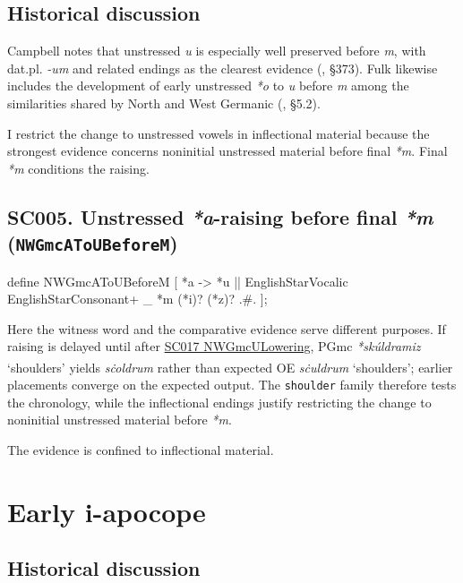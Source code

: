 \documentclass[
  british,
  a4paper,
  openany]{book}
\providecommand{\Pred}[1]{\textsuperscript{\dag}\emph{#1}}
\providecommand{\Recon}[1]{\emph{*#1}}
{\catcode`→=\active \global\def→{\ensuremath{\rightarrow}}}
\providecommand{\texorpdfstring}[2]{#1}
\providecommand{\Pred}[1]{\textsuperscript{\dag}\emph{#1}}
\providecommand{\Recon}[1]{\emph{*#1}}
{\catcode`→=\active \global\def→{\ensuremath{\rightarrow}}}
\begin{document}
\subsection{Historical discussion}\label{historical-discussion-2}

Campbell notes that unstressed \emph{u} is especially well preserved
before \emph{m}, with dat.pl. \emph{-um} and related endings as the
clearest evidence (,
§373). Fulk likewise includes the development of early unstressed
\emph{*o} to \emph{u} before \emph{m} among the similarities shared by
North and West Germanic (, §5.2).

I restrict the change to unstressed vowels in inflectional material
because the strongest evidence concerns noninitial unstressed material
before final \emph{*m}. Final \emph{*m} conditions the raising.

\subsection{\texorpdfstring{SC005. Unstressed \emph{*a}-raising before
final \emph{*m}
(\texttt{NWGmcAToUBeforeM})}{SC005. Unstressed -raising before final  (NWGmcAToUBeforeM)}}\label{rule-NWGmcAToUBeforeM}

\begin{ReaderFacingFoma}
define NWGmcAToUBeforeM [
    {*a} -> {*u} || EnglishStarVocalic EnglishStarConsonant+ _ {*m} ({*i})? ({*z})? .#.
];
\end{ReaderFacingFoma}

Here the witness word and the comparative evidence serve different
purposes. If raising is delayed until after
\hyperref[rule-NWGmcULowering]{SC017 NWGmcULowering}, PGmc
\Recon{skúldramiz} `shoulders' yields \Pred{sċoldrum} rather than
expected OE \emph{sċuldrum} `shoulders'; earlier placements converge on
the expected output. The \texttt{shoulder} family therefore tests the
chronology, while the inflectional endings justify restricting the
change to noninitial unstressed material before \emph{*m}.

The evidence is confined to inflectional material.

\newpage

\section{Early i-apocope}\label{early-i-apocope}

\subsection{Historical discussion}\label{historical-discussion-3}
\end{document}
